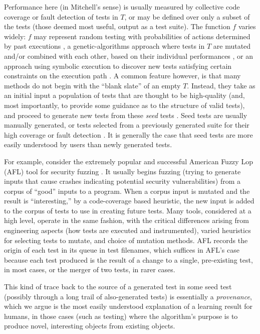 \documentclass[final]{article}
\begin{document}
Performance here (in Mitchell's sense) is usually measured by
collective code coverage or fault detection of tests in $T$, or may be
defined over only a subset of the tests (those deemed most useful,
output as a test suite).  The function $f$ varies widely: $f$ may
represent random testing with probabilities of actions determined by
past executions \cite{AndrewsL07}, a genetic-algorithms approach where
tests in $T$ are mutated and/or combined with each other, based on
their individual performances
\cite{McMinn04search-basedsoftware,FA11,aflfuzz}, or an approach using
symbolic execution to discover new tests satisfying certain
constraints on the execution path \cite{Whitebox,GodefroidKS05,KLEE}.
A common feature however, is that many methods do not begin with the
``blank slate'' of an empty $T$.  Instead, they take as an initial
input a population of tests that are thought to be high-quality (and,
most importantly, to provide some guidance as to the structure of
valid tests), and proceed to generate new tests from these \emph{seed}
tests
\cite{aflfuzz,Person:2011:DIS:1993498.1993558,Marinescu:2012:MTS:2337223.2337308,issta14,STVR_seeding}.
Seed tests are usually manually generated, or tests selected from a
previously generated suite for their high coverage or fault detection
\cite{YooHarman,stvrcausereduce}.  It is generally the case that seed
tests are more easily understood by users than newly generated tests.

For example, consider the extremely popular and successful American
Fuzzy Lop (AFL) tool
for security fuzzing \cite{aflfuzz}.  It usually begins fuzzing
(trying to generate inputs that cause crashes indicating potential
security vulnerabilities) from a corpus of ``good'' inputs to a
program.  When a corpus input is mutated and the result is
``interesting,'' by a code-coverage based heuristic, the new input is
added to the corpus of tests to use in creating future tests.  Many
tools, considered at a high level, operate in the same fashion, with the
critical differences arising from engineering aspects (how tests are executed
and instrumented), varied heuristics for selecting tests to mutate,
and choice of mutation methods.  AFL records the origin of each test
in its queue in test filenames, which suffices in AFL's case because
each test produced is the result of a change to a single, pre-existing
test, in most cases, or the merger of two tests, in rarer cases.

This kind of trace back to the source of a generated test in some seed
test (possibly through a long trail of also-generated tests) is
essentially a \emph{provenance}, which we argue is the most easily
understood explanation of a learning result for humans, in those cases
(such as testing) where the algorithm's purpose is to produce
novel, interesting objects from existing objects.
\end{document}
